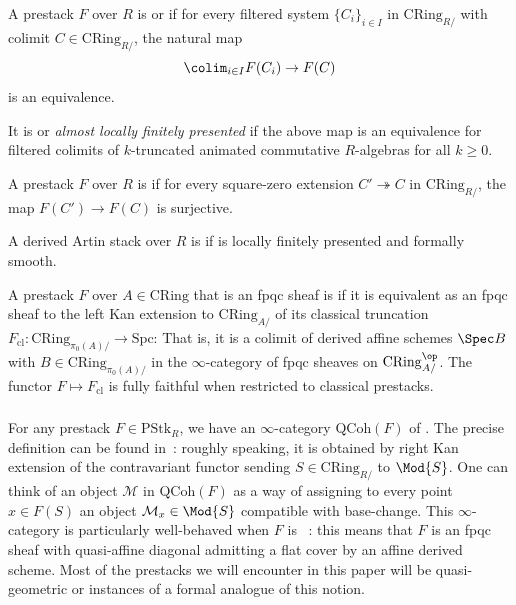 \documentclass[10pt]{amsart}
\begin{document}
\begin{definition}
\label{defn:almost_fp}
A prestack $F$ over $R$ is  or  if for every filtered system $\{C_i\}_{i\in I}$ in $\mathrm{CRing}_{R/}$ with colimit $C\in \mathrm{CRing}_{R/}$, the natural map
\[
\colim_{i\in I}F(C_i)\to F(C)
\]
is an equivalence.

It is  or \emph{almost locally finitely presented} if the above map is an equivalence for filtered colimits of $k$-truncated animated commutative $R$-algebras for all $k\ge 0$.
\end{definition}

\begin{definition}
\label{defn:formally_smooth}
A prestack $F$ over $R$ is  if for every square-zero extension $C'\twoheadrightarrow C$ in $\mathrm{CRing}_{R/}$, the map $F(C')\to F(C)$ is surjective.

A derived Artin stack over $R$ is  if is locally finitely presented and formally smooth.
\end{definition}

\begin{definition}
A prestack $F$ over $A\in \mathrm{CRing}$ that is an fpqc sheaf is  if it is equivalent as an fpqc sheaf to the left Kan extension to $\mathrm{CRing}_{A/}$ of its classical truncation $F_{\mathrm{cl}}:\mathrm{CRing}_{\pi_0(A)/}\to \mathrm{Spc}$: That is, it is a colimit of derived affine schemes $\Spec B$ with $B\in \mathrm{CRing}_{\pi_0(A)/}$ in the $\infty$-category of fpqc sheaves on $\mathrm{CRing}_{A/}^{\op}$. The functor $F\mapsto F_{\mathrm{cl}}$ is fully faithful when restricted to classical prestacks. 
\end{definition}


\subsubsection{}\label{subsubsec:cotangent_complex}
For any prestack $F\in \mathrm{PStk}_{R}$, we have an $\infty$-category $\mathrm{QCoh}(F)$ of . The precise definition can be found in~\cite[\S 6.2.2]{Lurie2018-kh}: roughly speaking, it is obtained by right Kan extension of the contravariant functor sending $S\in \mathrm{CRing}_{R/}$ to $\Mod{S}$. One can think of an object $\mathcal{M}$ in $\mathrm{QCoh}(F)$ as a way of assigning to every point $x\in F(S)$ an object $\mathcal{M}_x\in\Mod{S}$ compatible with base-change. This $\infty$-category is particularly well-behaved when $F$ is ~\cite[\S 9.1]{Lurie2018-kh}: this means that $F$ is an fpqc sheaf with quasi-affine diagonal admitting a flat cover by an affine derived scheme. Most of the prestacks we will encounter in this paper will be quasi-geometric or instances of a formal analogue of this notion.
\end{document}
